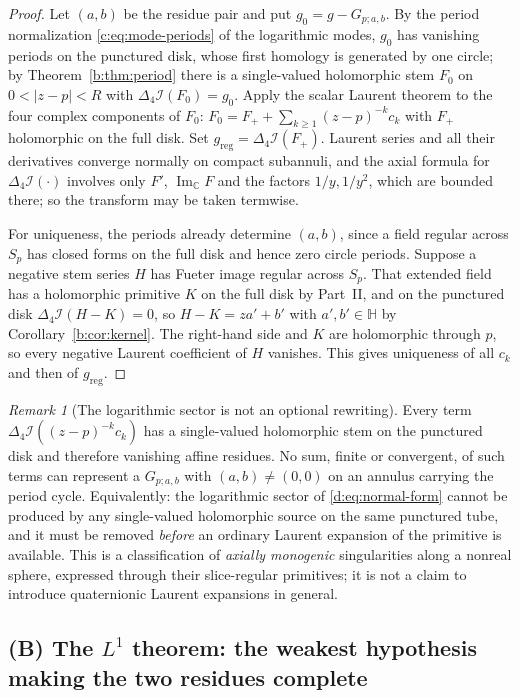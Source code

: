 \documentclass[11pt,a4paper]{article}
\numberwithin{equation}{section}
\theoremstyle{definition}
\theoremstyle{remark}
\newtheorem{remark}[theorem]{Remark}
\theoremstyle{plain}
\newcommand{\HH}{\mathbb H}
\newcommand{\CC}{\mathbb C}
\DeclareMathOperator{\Ima}{Im}
\newcommand{\lap}{\Delta_4}
\newcommand{\I}{\mathcal I}
\newcommand{\Sp}{S_{p}}
\newcommand{\abs}[1]{\lvert #1\rvert}
\begin{document}
\begin{proof}
Let $(a,b)$ be the residue pair and put $g_0=g-G_{p;a,b}$.  By the period
normalization \eqref{c:eq:mode-periods} of the logarithmic modes, $g_0$ has
vanishing periods on the punctured disk, whose first homology is generated by one
circle; by Theorem~\ref{b:thm:period} there is a single-valued
holomorphic stem $F_0$ on $0<\abs{z-p}<R$ with $\lap\I(F_0)=g_0$.  Apply
the scalar Laurent theorem to the four complex components of $F_0$:
$F_0=F_++\sum_{k\ge1}(z-p)^{-k}c_k$ with $F_+$ holomorphic on the full
disk.  Set $g_{\mathrm{reg}}=\lap\I(F_+)$.  Laurent series and all their
derivatives converge normally on compact subannuli, and the axial formula
for $\lap\I(\cdot)$ involves only $F'$, $\Ima_{\CC}F$ and the factors
$1/y,1/y^2$, which are bounded there; so the transform may be taken
termwise.

For uniqueness, the periods already determine $(a,b)$, since a field
regular across $\Sp$ has closed forms on the full disk and hence zero
circle periods.  Suppose a negative stem series $H$ has Fueter image
regular across $\Sp$.  That extended field has a holomorphic primitive $K$
on the full disk by Part~II, and on the punctured disk
$\lap\I(H-K)=0$, so $H-K=za'+b'$ with $a',b'\in\HH$ by
Corollary~\ref{b:cor:kernel}.  The right-hand side and $K$ are holomorphic through
$p$, so every negative Laurent coefficient of $H$ vanishes.  This gives
uniqueness of all $c_k$ and then of $g_{\mathrm{reg}}$.
\end{proof}

\begin{remark}[The logarithmic sector is not an optional rewriting]
\label{d:rem:log-sector}
Every term $\lap\I((z-p)^{-k}c_k)$ has a single-valued holomorphic stem on
the punctured disk and therefore vanishing affine residues.  No sum, finite
or convergent, of such terms can represent a $G_{p;a,b}$ with
$(a,b)\neq(0,0)$ on an annulus carrying the period cycle.  Equivalently:
the logarithmic sector of \eqref{d:eq:normal-form} cannot be produced by
any single-valued holomorphic source on the same punctured tube, and it
must be removed \emph{before} an ordinary Laurent expansion of the
primitive is available.  This is a classification of \emph{axially
monogenic} singularities along a nonreal sphere, expressed through their
slice-regular primitives; it is not a claim to introduce quaternionic
Laurent expansions in general.
\end{remark}

\subsection{(B) The $L^1$ theorem: the weakest hypothesis making the two
residues complete}
\end{document}
